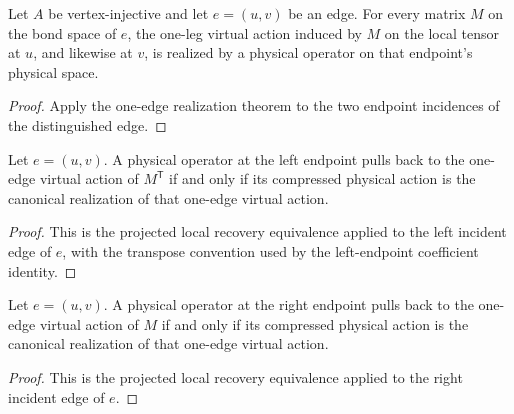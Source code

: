 \begin{theorem}%
    \label{thm:peps_virtualInsertionPhysicalRealization}
    \leanok
    Let $A$ be vertex-injective and let $e=(u,v)$ be an edge. For every
    matrix $M$ on the bond space of $e$, the one-leg virtual action induced
    by $M$ on the local tensor at $u$, and likewise at $v$, is realized by
    a physical operator on that endpoint's physical space.
    \begin{center}
        \TNPEPSInsertionPhysicalRealization
    \end{center}

\end{theorem}
\begin{proof}\leanok
    Apply the one-edge realization theorem to the two endpoint incidences of
    the distinguished edge.
\end{proof}

\begin{theorem}%
    \label{thm:peps_edgeLeftLocalVirtualOpOfPhysicalOp_eq_iff_projected_realization_eq}
    \leanok
    Let $e=(u,v)$. A physical operator at the left endpoint pulls back to
    the one-edge virtual action of $M^{\mathsf T}$ if and only if its
    compressed physical action is the canonical realization of that
    one-edge virtual action.
\end{theorem}
\begin{proof}\leanok
    This is the projected local recovery equivalence applied to the left
    incident edge of $e$, with the transpose convention used by the
    left-endpoint coefficient identity.
\end{proof}

\begin{theorem}%
    \label{thm:peps_edgeRightLocalVirtualOpOfPhysicalOp_eq_iff_projected_realization_eq}
    \leanok
    Let $e=(u,v)$. A physical operator at the right endpoint pulls back to
    the one-edge virtual action of $M$ if and only if its compressed physical
    action is the canonical realization of that one-edge virtual action.
\end{theorem}
\begin{proof}\leanok
    This is the projected local recovery equivalence applied to the right
    incident edge of $e$.
\end{proof}

